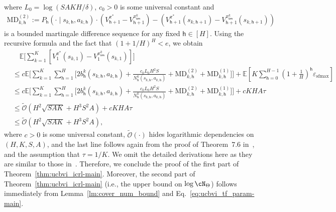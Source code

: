 \documentclass[10pt]{article}
\newcommand{\eps}{\varepsilon}
\newcommand{\<}{\left\langle}
\renewcommand{\>}{\right\rangle}
\newcommand{\E}{\mathbb{E}}
\newcommand{\temp}{{\tau}}
\newcommand{\tcO}{{\tilde{\mathcal O}}}
\newcommand{\state}{{s}}
\newcommand{\action}{{a}}
\newcommand{\plc}{{\pi}}
\newcommand{\optplc}{{\pi^*}}
\newcommand{\Numepi}{{K}}
\newcommand{\horizon}{{H}}
\renewcommand{\horizon}{{H}}
\newcommand{\transit}{{P}}
\newcommand{\bonus}{{b}}
\newcommand{\valuefun}{{V}}
\newcommand{\tfparspace}{{\Theta}}
\newcommand{\Numst}{{S}}
\newcommand{\Numact}{{A}}
\newcommand{\Numvi}{{N}}
\newcommand{\Vfun}{{\valuefun}}
\newcommand{\s}{{\mathsf{sm}}}
\newcommand{\epstemp}{{\eps_{\mathrm{sfmax}}}}
\newcommand{\MD}{{\mathrm{MD}}}
\def\sh{{\mathsf{h}}}
\begin{document}
where $L_0=\log(\Numst\Numact\Numepi\horizon/\delta)$,  $c_0>0$ is some universal constant and 
\begin{align*}
 \MD^{(2)}_{k,\sh}:=\transit_\sh(\cdot\mid\state_{k,\sh},\action_{k,\sh})\cdot(\Vfun_{\sh+1}^\optplc-\Vfun_{\sh+1}^{\plc^k_\s})-  (\Vfun_{\sh+1}^\optplc(\state_{k,\sh+  1})-\Vfun_{\sh+1}^{\plc^k_\s}(\state_{k,\sh+  1})) 
\end{align*} is a bounded martingale difference sequence for any fixed $\sh\in[\horizon]$. Using the recursive formula and the fact that $(1+1/\horizon)^\horizon<e$, we obtain
\begin{align*}
 &\quad \E\Big[ \sum_{k=1}^\Numepi [\Vfun_1^{\optplc}(\state_{k,1})-\Vfun_1^{\plc^k_{\s}}(\state_{k,1})
 ]  \Big]\\
 &\leq c\E\Bigg[\sum_{k=1}^\Numepi\sum_{\sh=1}^\horizon\Big[2\bonus_\sh^k(\state_{k,\sh},\action_{k,\sh})
+
\frac{c_0L_0\horizon^2\Numst}{\Numvi^k_\sh(\state_{k,\sh},\action_{k,\sh})}+\MD^{(2)}_{k,\sh}+\MD^{(1)}_{k,\sh}\Big]\Bigg]+\E[\Numepi\sum_{\sh=0}^{\horizon-1}(1+\frac{1}\horizon)^\sh\epstemp]\\
&\leq c\E\Bigg[\sum_{k=1}^\Numepi\sum_{\sh=1}^\horizon\Big[2\bonus_\sh^k(\state_{k,\sh},\action_{k,\sh})
+
\frac{c_0L_0\horizon^2\Numst}{\Numvi^k_\sh(\state_{k,\sh},\action_{k,\sh})}+\MD^{(2)}_{k,\sh}+\MD^{(1)}_{k,\sh}\Big]\Bigg]+c\Numepi\horizon\Numact\temp\\
&\leq 
\tcO (\horizon^2\sqrt{\Numst\Numact\Numepi}+\horizon^3\Numst^2\Numact)+c\Numepi\horizon\Numact\temp\\
&\leq \tcO(\horizon^2\sqrt{\Numst\Numact\Numepi}+\horizon^3\Numst^2\Numact),
\end{align*} where $c>0$ is some universal constant,  $\tcO(\cdot)$ hides logarithmic dependencies on $(\horizon,\Numepi,\Numst,\Numact)$, and the last line follows again from the proof of Theorem~7.6 in~\cite{agarwal2019reinforcement}, and the assumption that $\temp=1/\Numepi$.
 We omit the detailed derivations here as they are similar to those in~\cite{azar2017minimax,agarwal2019reinforcement}. Therefore, we conclude the proof of the first part of Theorem~\ref{thm:ucbvi_icrl-main}. Moreover,  the second part of Theorem~\ref{thm:ucbvi_icrl-main} (i.e., the upper bound on $\log\cN_{\tfparspace}$) follows immediately from Lemma~\ref{lm:cover_num_bound} and Eq.~\eqref{eq:ucbvi_tf_param-main}.

 
\end{document}
